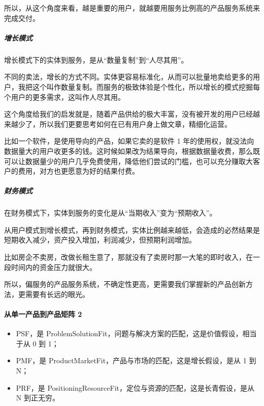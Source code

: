 \documentclass[letterpaper,10pt,english]{sphinxmanual}
\begin{document}
所以，从这个角度来看，越是重要的用户，就越要用服务比例高的产品服务系统来完成交付。


\subparagraph{增长模式}
\label{\detokenize{chapter_introduction/Product:id35}}
增长模式下的实体到服务，是从“数量复制”到“人尽其用”。

不同的卖法，增长的方式不同。实体更容易标准化，从而可以批量地卖给更多的用户，我把这个叫作数量复制。而服务的极致体验是个性化，所以增长的模式挖掘每个用户的更多需求，这叫作人尽其用。

这个角度给我们的启发就是，随着产品供给的极大丰富，没有被开发的用户已经越来越少了，所以我们更要思考如何在已有用户身上做文章，精细化运营。

比如一个软件，是使用导向的产品，如果它卖的是软件 1
年的使用权，就没法向数据量大的用户收更多的钱。这时候如果改为结果导向，根据数据量收费，那么既可以让数据量少的用户几乎免费使用，降低他们尝试的门槛，也可以充分赚取大客户的费用，对方也更愿意为好的结果付费。


\subparagraph{财务模式}
\label{\detokenize{chapter_introduction/Product:id36}}
在财务模式下，实体到服务的变化是从“当期收入”变为“预期收入”。

从用户模式到增长模式，再到财务模式，实体比例越来越低，会造成的必然结果是短期收入减少，资产投入增加，利润减少，但预期利润增加。

比如房企不卖房，改做长租生意了，那就没有了卖房时那一大笔的即时收入，在一段时间内的资金压力就很大。

所以，偏服务的产品服务系统，不确定性更高，更需要我们掌握新的产品创新方法，更需要有长远的眼光。


\paragraph{从单一产品到产品矩阵 2\sphinxfootnotemark[49]}
\label{\detokenize{chapter_introduction/Product:id37}}%
\begin{footnotetext}[49]\sphinxAtStartFootnote
{}
%
\end{footnotetext}\ignorespaces \begin{itemize}
\item {} 
PSF，是
Problem\sphinxhyphen{}Solution\sphinxhyphen{}Fit，问题与解决方案的匹配，这是价值假设，相当于从 0
到 1；

\item {} 
PMF，是 Product\sphinxhyphen{}Market\sphinxhyphen{}Fit，产品与市场的匹配，这是增长假设，是从 1 到
N；

\item {} 
PRF，是
Positioning\sphinxhyphen{}Resource\sphinxhyphen{}Fit，定位与资源的匹配，这是长青假设，是从 N
到正无穷。

\end{itemize}
\end{document}
